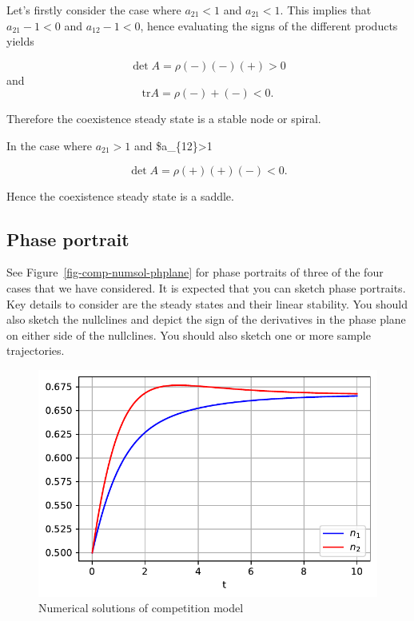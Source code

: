 \documentclass[
  letterpaper,
  DIV=11,
  numbers=noendperiod]{scrreprt}
\begin{document}
Let's firstly consider the case where \(a_{21}<1\) and \(a_{21}<1\).
This implies that \(a_{21}-1<0\) and \(a_{12}-1<0\), hence evaluating
the signs of the different products yields

\[
\det{A} = \rho(-)(-)(+)>0 
\] and \[
\mathrm{tr}{A}= \rho(-) + (-)<0.
\]

Therefore the coexistence steady state is a stable node or spiral.

In the case where \(a_{21}>1\) and \$a\_\{12\}\textgreater1

\[
\det{A} = \rho(+)(+)(-)<0 .
\]

Hence the coexistence steady state is a saddle.

\hypertarget{phase-portrait}{%
\subsection{Phase portrait}\label{phase-portrait}}

See Figure~\ref{fig-comp-numsol-phplane} for phase portraits of three of
the four cases that we have considered. It is expected that you can
sketch phase portraits. Key details to consider are the steady states
and their linear stability. You should also sketch the nullclines and
depict the sign of the derivatives in the phase plane on either side of
the nullclines. You should also sketch one or more sample trajectories.

\begin{figure}

{\centering \includegraphics{ContinuousTimeTwoSepcies_files/figure-pdf/fig-compete-numsol-output-1.pdf}

}

\caption{\label{fig-compete-numsol}Numerical solutions of competition
model}

\end{figure}
\end{document}

